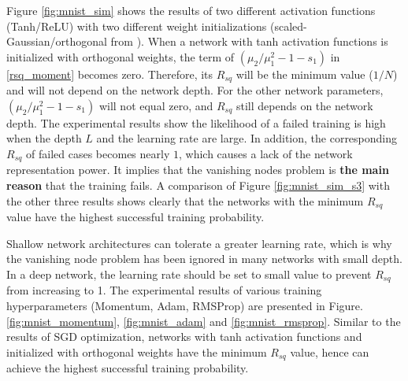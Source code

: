 
Figure \ref{fig:mnist_sim} shows the results of two different activation functions (Tanh/ReLU) with two
different weight initializations (scaled-Gaussian/orthogonal from \cite{mft:linear}).
When a network with tanh activation functions is initialized with orthogonal weights,
the term of  $(\mu_2/\mu_1^2-1-s_1)$ in \eqref{rsq_moment} becomes zero.
Therefore, its $R_{sq}$ will be the minimum value ($1/N$) and will not depend on the network depth.
For the other network parameters, $(\mu_2/\mu_1^2-1-s_1) $ will not equal zero,
and $R_{sq}$ still depends on the network depth. The experimental results show the likelihood of a failed
training is high when the depth $L$ and the learning rate are large. In addition, the corresponding $R_{sq}$
of failed cases becomes nearly $1$, which causes a lack of the network representation power.
It implies that the vanishing nodes problem is \textbf{the main reason} that the training fails.
A comparison of Figure \ref{fig:mnist_sim_s3} with the other three results shows clearly that the networks
with the minimum $R_{sq}$ value have the highest successful training probability.

Shallow network architectures can tolerate a greater learning rate, which is why the vanishing node problem
has been ignored in many networks with small depth. In a deep network, the learning rate should be set to
small value to prevent $R_{sq}$ from increasing to 1. The experimental results of various training
hyperparameters (Momentum, Adam, RMSProp) are presented in Figure. \ref{fig:mnist_momentum},
\ref{fig:mnist_adam} and \ref{fig:mnist_rmsprop}. Similar to the results of SGD optimization,
networks with tanh activation functions and initialized with orthogonal weights have the minimum $R_{sq}$
value, hence can achieve the highest successful training probability.


